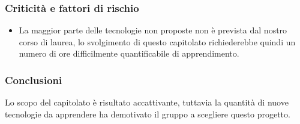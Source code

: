 \subsubsection{Criticità e fattori di rischio}
\begin{itemize}
	\item La maggior parte delle tecnologie non proposte non è prevista dal nostro corso di laurea, lo svolgimento di questo capitolato richiederebbe quindi un numero di ore difficilmente quantificabile di apprendimento.
\end{itemize}
\subsubsection{Conclusioni}
Lo scopo del capitolato è risultato accattivante, tuttavia la quantità di nuove tecnologie da apprendere ha demotivato il gruppo a scegliere questo progetto.